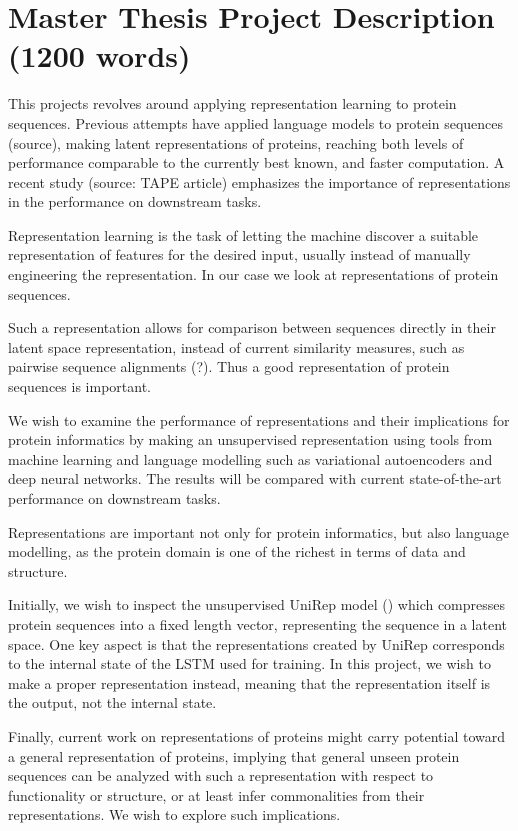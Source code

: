 \documentclass[a4paper,11pt]{article}
\begin{document}
\section*{Master Thesis Project Description (1200 words)}
This projects revolves around applying representation learning to protein sequences. Previous attempts have applied language models to protein sequences (source), making latent representations of proteins, reaching both levels of performance comparable to the currently best known, and faster computation. A recent study (source: TAPE article) emphasizes the importance of representations in the performance on downstream tasks.

Representation learning is the task of letting the machine discover a suitable representation of features for the desired input, usually instead of manually engineering the representation. In our case we look at representations of protein sequences.

Such a representation allows for comparison between sequences directly in their latent space representation, instead of current similarity measures, such as pairwise sequence alignments (?). Thus a good representation of protein sequences is important.

We wish to examine the performance of representations and their implications for protein informatics by making an unsupervised representation using tools from machine learning and language modelling such as variational autoencoders and deep neural networks. The results will be compared with current state-of-the-art performance on downstream tasks.

Representations are important not only for protein informatics, but also language modelling, as the protein domain is one of the richest in terms of data and structure.

Initially, we wish to inspect the unsupervised UniRep model (\cite{alley2019unified}) which compresses protein sequences into a fixed length vector, representing the sequence in a latent space. One key aspect is that the representations created by UniRep corresponds to the internal state of the LSTM used for training. In this project, we wish to make a proper representation instead, meaning that the representation itself is the output, not the internal state.

Finally, current work on representations of proteins might carry potential toward a general representation of proteins, implying that general unseen protein sequences can be analyzed with such a representation with respect to functionality or structure, or at least infer commonalities from their representations. We wish to explore such implications.
\end{document}
